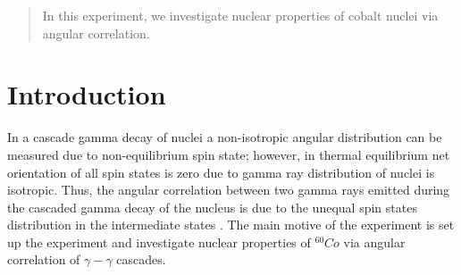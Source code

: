\begin{abstract}
   In this experiment, we investigate nuclear properties of cobalt nuclei via angular correlation.
\end{abstract}
\section{Introduction}
In a cascade gamma decay of nuclei a non-isotropic angular distribution can be measured due to non-equilibrium spin state; however, in thermal equilibrium net orientation of all spin states is zero due to gamma ray distribution of nuclei is isotropic. Thus, the angular correlation between two gamma rays emitted during the cascaded gamma decay of
the nucleus is due to the unequal spin states distribution in the intermediate states \cite{descr}.
The main motive of the experiment is set up the experiment and investigate nuclear properties of $ ^60Co $ via angular correlation of $ \gamma-\gamma $ cascades\cite{descr}.